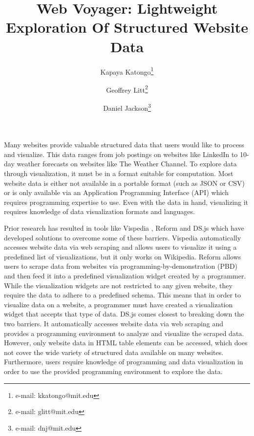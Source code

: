 \documentclass{vgtc}                          %
\title{Web Voyager: Lightweight Exploration Of Structured Website Data}
\author{Kapaya Katongo\thanks{e-mail: kkatongo@mit.edu}
\and Geoffrey Litt\thanks{e-mail: glitt@mit.edu}
\and Daniel Jackson\thanks{e-mail: dnj@mit.edu}}
\affiliation{\scriptsize MIT CSAIL}
\begin{document}

\label{introduction}

\maketitle

Many websites provide valuable structured data that users would like to process and visualize. This data ranges from job postings
on websites like LinkedIn to 10-day weather forecasts on websites like The Weather Channel. To explore data through visualization, it must be in a format
suitable for computation. Most website data is either not available in a portable format (such as JSON or CSV) or is only available
via an Application Programming Interface (API) which requires programming expertise to use. Even with the data in hand,
visualizing it requires knowledge of data visualization formats and languages.

Prior research has resulted in tools like Vispedia \cite{chan2008}, Reform \cite{toomim2009} and DS.js \cite{zhang2017} which have
developed solutions to overcome some of these barriers. Vispedia automatically accesses website data via web scraping and allows users
to visualize it using a predefined list of visualizations, but it only works on Wikipedia. Reform allows users to scrape data from websites via
programming-by-demonstration (PBD) and then feed it into a predefined visualization widget created by a programmer. While the visualization
widgets are not restricted to any given website, they require the data to adhere to a predefined schema. This means that in order to visualize
data on a website, a programmer must have created a visualization widget that accepts that type of data. DS.js comes closest to
breaking down the two barriers. It automatically accesses website data via web scraping and provides a programming environment
to analyze and visualize the scraped data. However, only website data in HTML table elements can be accessed, which does not
cover the wide variety of structured data available on many websites. Furthermore, users require knowledge of programming
and data visualization in order to use the provided programming environment to explore the data.
\end{document}
